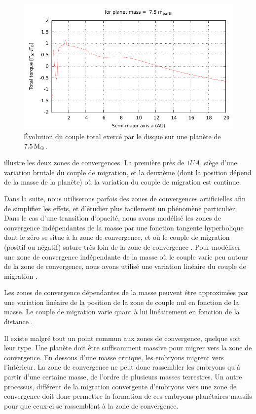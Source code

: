 \begin{figure}[htbp]
\centering
\includegraphics[width=0.75\linewidth]{figure/total_torque_fixed_m.pdf}
\caption{Évolution du couple total exercé par le disque sur une planète de $7.5\mathrm{\thinspace M_\oplus}$. }\label{fig:total_torque_fixed_m}
\end{figure}

 illustre les deux zones de convergences. La première près de $1\unit{UA}$, siège d'une
variation brutale du couple de migration, et la deuxième (dont la position dépend de la masse de la planète) où la variation du
couple de migration est continue. 

Dans la suite, nous utiliserons parfois des zones de convergences artificielles afin de simplifier les effets, et d'étudier
plus facilement un phénomène particulier. Dans le cas d'une transition d'opacité, nous avons modélisé les zones de convergence
indépendantes de la masse par une fonction tangente hyperbolique dont le zéro se situe à la zone de convergence, et où le couple de
migration (positif ou négatif) sature très loin de la zone de convergence . Pour modéliser une zone de
convergence indépendante de la masse où le couple varie peu autour de la zone de convergence, nous avons utilisé une variation
linéaire du couple de migration .

Les zones de convergence dépendantes de la masse peuvent être approximées par une variation linéaire de la position de la zone
de couple nul en fonction de la masse. Le couple de migration varie quant à lui linéairement en fonction de la distance
. 

\bigskip

Il existe malgré tout un point commun aux zones de convergence, quelque soit leur type. Une planète doit être suffisamment massive pour migrer vers la zone de convergence. En dessous d'une masse critique, les embryons migrent vers l'intérieur. La zone de convergence ne peut donc rassembler les embryons qu'à partir d'une certaine masse, de l'ordre de plusieurs masses terrestres. Un autre processus, différent de la migration convergente d'embryons vers une zone de convergence doit donc permettre la formation de ces embryons planétaires massifs pour que ceux-ci se rassemblent à la zone de convergence.

